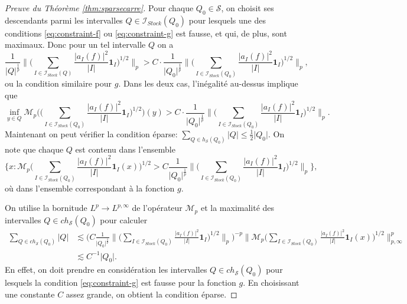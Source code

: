 \documentclass[11pt]{amsart}
\newcommand{\one}{\mathbf{1}}
\newcommand{\ii}{\mathscr}
\newcommand{\ic}{\mathcal}
\begin{document}
\begin{proof}[Preuve du Th\'eor\`eme \ref{thm:sparsecarre}]
Pour chaque $Q_0 \in \ic S$, on choisit ses descendants parmi les intervalles  $Q \in \ii I_{Stock}(Q_0)$ pour lesquels une des conditions \eqref{eq:constraint-f} ou \eqref{eq:constraint-g} est fausse, et qui, de plus, sont maximaux. Donc pour un tel intervalle $Q$ on a 
\[
\frac{1}{\vert Q \vert^{\frac{1}{p}}} \big\|  \Big( \sum_{ I \in \ii I_{Stock}(Q)}  \frac{\vert a_I(f) \vert^2}{\vert I \vert}  \one_I \Big)^{1/2}   \big\|_{p} > C \cdot \frac{1}{\vert Q_0 \vert^{\frac{1}{p}}} \big\|  \Big( \sum_{ I \in \ii I_{Stock}(Q_0)}  \frac{\vert a_I(f) \vert^2}{\vert I \vert}  \one_I \Big)^{1/2}   \big\|_{p},
\]
ou la condition similaire pour $g$. Dans les deux cas, l'in\'egalit\'e au-dessus implique que 
\[
\inf_{y \in Q} \ic M_p \big( \big( \sum_{ I \in \ii I_{Stock}(Q_0)}  \frac{\vert a_I(f) \vert^2}{\vert I \vert}  \one_I \big)^{1/2}  \big)(y ) >C \cdot \frac{1}{\vert Q_0 \vert^{\frac{1}{p}}} \big\|  \big( \sum_{ I \in \ii I_{Stock}(Q_0)}  \frac{\vert a_I(f) \vert^2}{\vert I \vert}  \one_I \big)^{1/2}   \big\|_{p}.
\]
Maintenant on peut  v\'erifier la condition \'eparse: $\sum_{Q \in h_{\ic S}(Q_0)} \vert Q \vert \leq \frac{1}{2} \vert Q_0 \vert$. On note que chaque $Q$ est contenu dans l'ensemble
\[
 \Big\lbrace  x: \ic M_p \big( \sum_{ I \in \ii I_{Stock}(Q_0)}  \frac{\vert a_I(f)\vert^2}{\vert I \vert}  \one_I(x) \big)^{1/2} > C  \frac{1}{\vert Q_0 \vert^{\frac{1}{p}}} \big\|  \big( \sum_{ I \in \ii I_{Stock}(Q_0)}  \frac{\vert a_I(f) \vert^2}{\vert I \vert}  \one_I \big)^{1/2}   \big\|_{p} \Big\rbrace, 
\]
o\`u dans l'ensemble correspondant \`a la fonction $g$.

On utilise la bornitude $L^p \to L^{p, \infty}$ de l'op\'erateur $\ic M_p$ et la maximalit\'e des intervalles $Q \in ch_{\ic S}(Q_0)$ pour calculer
{\fontsize{10.5}{10}
\begin{align*}
\sum_{Q \in ch_{\ic S}\left( Q_0 \right) } \vert Q \vert &\lesssim \Big(  C  \frac{1}{\vert Q_0 \vert^{\frac{1}{p}}} \big\|  \big( \sum_{ I \in \ii I_{Stock}(Q_0)}  \frac{\vert a_I(f) \vert^2}{\vert I \vert}  \one_I \big)^{1/2}   \big\|_p \Big)^{-p} \big\| \ic M_p \big( \sum_{ I \in \ii I_{Stock}(Q_0)}  \frac{\vert a_I(f) \vert^2}{\vert I \vert}  \one_I(x) \big)^{1/2} \big\|_{p, \infty}^p \\
& \lesssim C^{-1} \vert Q_0\vert.
\end{align*}}
En effet, on doit prendre en consid\'eration les intervalles $Q \in ch_{\ic S}(Q_0)$ pour lesquels la condition \eqref{eq:constraint-g} est fausse pour la fonction $g$. En choisissant une constante $C$ assez grande, on obtient la condition \'eparse. 



\end{proof}
\end{document}
